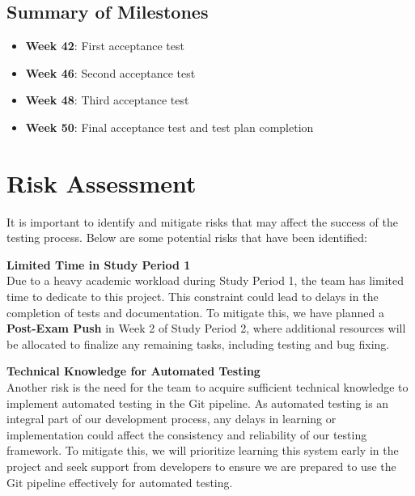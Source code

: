 \documentclass{article}
\begin{document}
\subsection{Summary of Milestones}
\begin{itemize}
    \item \textbf{Week 42}: First acceptance test
    \item \textbf{Week 46}: Second acceptance test
    \item \textbf{Week 48}: Third acceptance test
    \item \textbf{Week 50}: Final acceptance test and test plan completion
\end{itemize}

\section{Risk Assessment}
It is important to identify and mitigate risks that may affect the success of the testing process. Below are some potential risks that have been identified:

\textbf{Limited Time in Study Period 1}\\
Due to a heavy academic workload during Study Period 1, the team has limited time to dedicate to this project. This constraint could lead to delays in the completion of tests and documentation. To mitigate this, we have planned a \textbf{Post-Exam Push} in Week 2 of Study Period 2, where additional resources will be allocated to finalize any remaining tasks, including testing and bug fixing.

\textbf{Technical Knowledge for Automated Testing}\\
Another risk is the need for the team to acquire sufficient technical knowledge to implement automated testing in the Git pipeline. As automated testing is an integral part of our development process, any delays in learning or implementation could affect the consistency and reliability of our testing framework. To mitigate this, we will prioritize learning this system early in the project and seek support from developers to ensure we are prepared to use the Git pipeline effectively for automated testing.



\cite{tan2014introduction}

\newpage
\printbibliography
\end{document}
